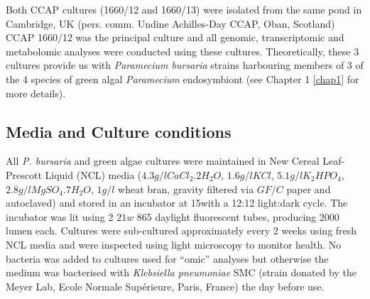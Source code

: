 Both CCAP cultures (1660/12 and 1660/13) were isolated from the same pond in Cambridge, UK (pers. comm. Undine Achilles-Day CCAP, Oban, Scotland)
CCAP 1660/12 was the principal culture and all genomic, transcriptomic and metabolomic analyses were conducted using these cultures. 
Theoretically, these 3 cultures provide us with \textit{Paramecium bursaria} strains harbouring members of 3 of the 4 species of 
green algal \textit{Paramecium} endosymbiont (see Chapter 1 \ref{chap1} for more details).

\subsection{Media and Culture conditions}
All \textit{P. bursaria} and green algae cultures were maintained in 
New Cereal Leaf-Prescott Liquid (NCL) media 
(\(4.3g/l CaCl_{2}.2H_{2}O\), \(1.6g/l KCl\), \(5.1g/l K_{2}HPO_{4}\), \(2.8g/l MgSO_{4}.7H_{2}O\), 
\(1g/l\) wheat bran, gravity filtered via \(GF/C\) paper and autoclaved) \citep{NCLCCAP} and stored in 
an incubator at 15\celsius with a 12:12 light:dark cycle.  The incubator was
lit using 2 \(21w\) 865 daylight fluorescent tubes, producing 2000 lumen each.
Cultures were sub-cultured approximately every 2 weeks using fresh NCL media and were inspected using light microscopy to monitor health.  
No bacteria was added to cultures used for ``omic'' analyses but otherwise the medium was bacterised with
\textit{Klebsiella pneumoniae} SMC (strain donated by the Meyer Lab, Ecole Normale Supérieure, Paris, France) the day before use. 

